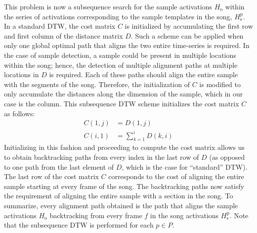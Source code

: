 \documentclass{article}
\begin{document}
This problem is now a subsequence search for the sample activations $H_\mathrm{o}$ within the series of activations corresponding to the sample templates in the song, $H_{\mathrm{s}}^{\mathrm{p}}$. %
In a standard DTW, the cost matrix $C$ is initialized by accumulating the first row and first column of the distance matrix $D$.
Such a scheme can be applied when only one global optimal path that aligns the two entire time-series is required. In the case of sample detection, a sample could be present in multiple locations within the song; hence, the detection of multiple alignment paths at multiple locations in $D$ is required. Each of these paths should align the entire sample with the segments of the song. Therefore, the initialization of $C$ is modified to only accumulate the distances along the dimension of the sample, which in our case is the column. This subsequence DTW scheme\cite{Müller2007} initializes the cost matrix $C$ as follows:
\begin{equation}
\label{cost_init_new}
\begin{aligned}
C(1,j) &= D(1,j)\\
C(i,1) &= \sum_{k=1}^{i} D(k,i)
\end{aligned}
\end{equation}
Initializing in this fashion and proceeding to compute the cost matrix allows us to obtain backtracking paths from every index in the last row of $D$ (as opposed to one path from the last element of $D$, which is the case for ``standard'' DTW). The last row of the cost matrix $C$ corresponds to the cost of aligning the entire sample starting at every frame of the song. The backtracking paths now satisfy the requirement of aligning the entire sample with a section in the song. To summarize, every alignment path obtained is the path that aligns the sample activations $H_\mathrm{o}$ backtracking from every frame $f$ in the song activations $H_{\mathrm{s}}^{\mathrm{p}}$. Note that the subsequence DTW is performed for each $p \in P$.
\end{document}
